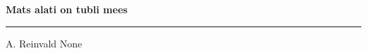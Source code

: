 \documentclass[10pt]{book}
\begin{document}
{
  \samepage
  \raggedbottom
  \raggedright
  \sloppy


  \vspace{0.2in}

  \noindent\begin{minipage}{.1\textwidth}
    \hfill\vspace{0.1in}
  \end{minipage}%
  \noindent\begin{minipage}{.8\textwidth}
    \centering
    \bfseries
    \large Mats alati on tubli mees
  \end{minipage}%
  \noindent\begin{minipage}{.1\textwidth}
      \hfill\vspace{0.1in}
  \end{minipage}

  \nopagebreak[4]
  \vspace{0.1in}
  \nopagebreak[4]
  \hrule height 0.05ex
  \nopagebreak[4]
  \vspace{-0.05in}

  {\footnotesize A. Reinvald \hfill None }\\
  \vspace{0.01in}



}
\end{document}
